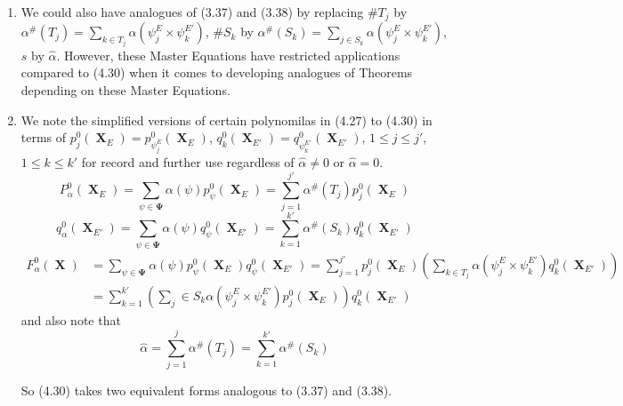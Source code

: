 \documentclass[a4paper,12pt]{article}
\DeclareMathOperator{\x}{\mathrm{X}}
\theoremstyle{definition}
\theoremstyle{underlinethm}
\theoremstyle{definition}
\begin{document}
\begin{enumerate}[label=(\alph*)]
\item We could also have analogues of (3.37) and (3.38)  by replacing $\# T_{j}$ by $\alpha^{\#}(T_{j}) =\sum_{k \in T_{j}} \alpha (\psi_{j}^{E} \times \psi_{k}^{E'})$, $\# S_{k}$ by $\alpha^{\#}(S_{k}) =\sum_{j\in S_{k}} \alpha (\psi_{j}^{E} \times \psi_{k}^{E'})$, $s$ by $\hat{\alpha}$. However, these Master Equations have restricted applications compared to (4.30) when it comes to developing analogues of Theorems depending on these Master Equations.

\item We note the simplified versions of certain polynomilas in (4.27) to (4.30) in terms of $p_{j}^{0}(\boldsymbol{\x}_{E})=p_{\psi^{E}_{j}}^{0}(\boldsymbol{\x}_{E})$, $q_{k}^{0}(\boldsymbol{\x}_{E'}) = q_{\psi^{E'}_{k}}^{0}(\boldsymbol{\x}_{E'})$, $1 \leq j \leq j'$, $1 \leq k \leq k'$ for record and further use regardless of $\hat{\alpha} \neq  0$ or $\hat{\alpha}=0$. 
\begin{equation}
P_{\alpha}^{0}(\boldsymbol{\x}_{E}) = \sum_{\psi \in \boldsymbol{\Psi}} \alpha (\psi) p_{\psi}^{0}(\boldsymbol{\x}_{E}) = \sum_{j=1}^{j'} \alpha^{\#} (T_{j}) p_{j}^{0}(\boldsymbol{\x}_{E})\tag{4.31}\label{eq-4.31}
\end{equation}
\begin{equation}
q_{\alpha}^{0}(\boldsymbol{\x}_{E'}) = \sum_{\psi \in \boldsymbol{\Psi}} \alpha(\psi) q_{\psi}^{0}(\boldsymbol{\x}_{E'}) =\sum_{k=1}^{k'} \alpha^{\#}(S_{k}) q_{k}^{0} (\boldsymbol{\x}_{E'})\tag{4.32}\label{eq-4.32}
\end{equation}
\begin{align*}
F_{\alpha}^{0}(\boldsymbol{\x}) &= \sum_{\psi \in \boldsymbol{\Psi}}\alpha (\psi) p_{\psi}^{0}(\boldsymbol{\x}_{E}) q_{\psi}^{0}(\boldsymbol{\x}_{E'}) = \sum_{j=1}^{j'} p_{j}^{0}(\boldsymbol{\x}_{E}) \left(\sum_{k \in T_{j}} \alpha(\psi_{j}^{E} \times \psi_{k}^{E'}) q_{k}^{0}(\boldsymbol{\x}_{E'})\right)\\
& = \sum_{k=1}^{k'} \left(\sum_{j} \in S_{k} \alpha (\psi_{j}^{E} \times \psi_{k}^{E'}) p_{j}^{0} (\boldsymbol{\x}_{E})\right) q_{k}^{0}(\boldsymbol{\x}_{E'})\tag{4.33}\label{eq-4.33}
\end{align*} 
and also note that
\begin{equation}
\hat{\alpha} = \sum_{j=1}^{j} \alpha^{\#}(T_{j}) = \sum_{k=1}^{k'} \alpha^{\#}(S_{k})\tag{4.34}\label{eq-4.34}
\end{equation}

So (4.30) takes two equivalent forms analogous to (3.37) and (3.38).


\end{enumerate}
\end{document}
